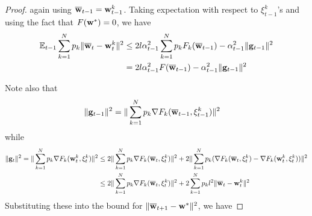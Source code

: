 \begin{proof}
\begin{comment}
	\end{align*}
	\begin{align*}
	\sum_{k=1}^{N}p_{k}\|\ov{w}_{t}-\vw_{t}^{k}\|^{2} & =\sum_{k=1}^{N}p_{k}\|\ov{w}_{t-1}-\alpha_{t-1}\vg_{t-1}+\beta_{t-1}(\ov{v}_{t}-\ov{v}_{t-1})-\ov{w}_{t-1}+\alpha_{t-1}\vg_{t-1,k}-\beta_{t-1}(v_{t}-\ov{v}_{t-1})\|^{2}\\
	& =\sum_{k=1}^{N}p_{k}\|-\alpha_{t-1}\vg_{t-1}+\alpha_{t-1}\vg_{t-1,k}+\beta_{t-1}(\ov{v}_{t}-v_{t})\|^{2}\\
	& =\sum_{k=1}^{N}p_{k}\|-\alpha_{t-1}\vg_{t-1}+\alpha_{t-1}\vg_{t-1,k}+\beta_{t-1}(\ov{w}_{t-1}-\alpha_{t-1}\vg_{t-1}-\ov{w}_{t-1}-\alpha_{t-1}\vg_{t-1,k})\|^{2}\\
	& =\alpha_{t-1}^{2}(1+\beta_{t-1})^{2}\sum_{k=1}^{N}p_{k}\|\vg_{t-1}-\vg_{t-1,k}\|^{2}
	\end{align*}
	\end{comment}
	again using ${\overline{\mathbf{w}}}_{t-1}={\mathbf{w}}_{t-1}^{k}$. Taking expectation
	with respect to $\xi_{t-1}^{k}$'s and using the fact that $F({\mathbf{w}}^{\ast})=0$,
	we have 
	\begin{align*}
	\mathbb{E}_{t-1}\sum_{k=1}^{N}p_{k}\|{\overline{\mathbf{w}}}_{t}-{\mathbf{w}}_{t}^{k}\|^{2} & \leq2l\alpha_{t-1}^{2}\sum_{k=1}^{N}p_{k}F_{k}({\overline{\mathbf{w}}}_{t-1})-\alpha_{t-1}^{2}\|{\mathbf{g}}_{t-1}\|^{2}\\
	& =2l\alpha_{t-1}^{2}F({\overline{\mathbf{w}}}_{t-1})-\alpha_{t-1}^{2}\|{\mathbf{g}}_{t-1}\|^{2}
	\end{align*}
	
	Note also that 
	\begin{align*}
	\|{\mathbf{g}}_{t-1}\|^{2} & =\|\sum_{k=1}^{N}p_{k}\nabla F_{k}({\overline{\mathbf{w}}}_{t-1},\xi_{t-1}^{k})\|^{2}
	\end{align*}
	while
	\begin{align*}
	\|{\mathbf{g}}_{t}\|^{2}=\|\sum_{k=1}^{N}p_{k}\nabla F_{k}({\mathbf{w}}_{t}^{k},\xi_{t}^{k})\|^{2} & \leq2\|\sum_{k=1}^{N}p_{k}\nabla F_{k}({\overline{\mathbf{w}}}_{t},\xi_{t}^{k})\|^{2}+2\|\sum_{k=1}^{N}p_{k}(\nabla F_{k}({\overline{\mathbf{w}}}_{t},\xi_{t}^{k})-\nabla F_{k}({\mathbf{w}}_{t}^{k},\xi_{t}^{k}))\|^{2}\\
	& \leq2\|\sum_{k=1}^{N}p_{k}\nabla F_{k}({\overline{\mathbf{w}}}_{t},\xi_{t}^{k})\|^{2}+2\sum_{k=1}^{N}p_{k}l^{2}\|{\overline{\mathbf{w}}}_{t}-{\mathbf{w}}_{t}^{k}\|^{2}
	\end{align*}
	Substituting these into the bound for $\|{\overline{\mathbf{w}}}_{t+1}-{\mathbf{w}}^{\ast}\|^{2}$,
	we have 
	

\end{proof}
